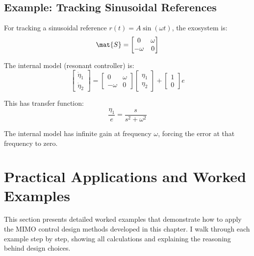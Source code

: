 \subsection{Example: Tracking Sinusoidal References}

For tracking a sinusoidal reference $r(t) = A\sin(\omega t)$, the exosystem is:
\begin{equation}
\mat{S} = \begin{bmatrix} 0 & \omega \\ -\omega & 0 \end{bmatrix}
\end{equation}

The internal model (resonant controller) is:
\begin{equation}
\begin{bmatrix} \dot{\eta}_1 \\ \dot{\eta}_2 \end{bmatrix} =
\begin{bmatrix} 0 & \omega \\ -\omega & 0 \end{bmatrix}
\begin{bmatrix} \eta_1 \\ \eta_2 \end{bmatrix} +
\begin{bmatrix} 1 \\ 0 \end{bmatrix} e
\end{equation}

This has transfer function:
\begin{equation}
\frac{\eta_1}{e} = \frac{s}{s^2 + \omega^2}
\end{equation}

The internal model has infinite gain at frequency $\omega$, forcing the error at that frequency to zero.

\section{Practical Applications and Worked Examples}
\label{sec:examples}

This section presents detailed worked examples that demonstrate how to apply the MIMO control design methods developed in this chapter. I walk through each example step by step, showing all calculations and explaining the reasoning behind design choices.

